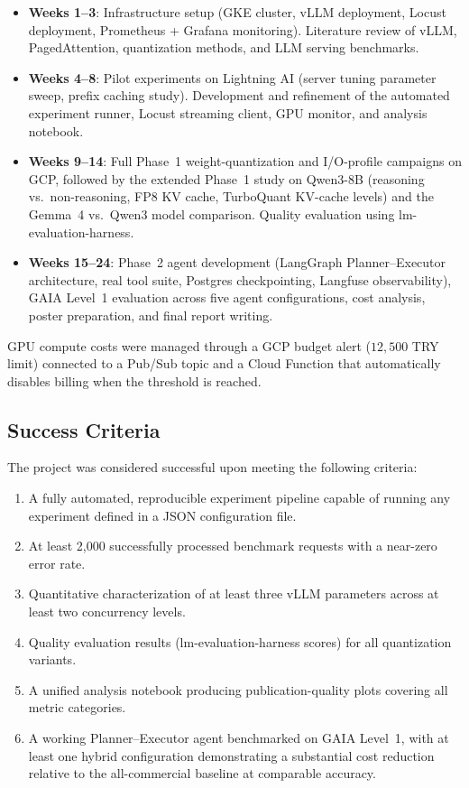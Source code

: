\documentclass[a4paper,12pt]{report}
\begin{document}
\begin{itemize}
    \item \textbf{Weeks 1--3}: Infrastructure setup (GKE cluster, vLLM deployment, Locust deployment, Prometheus + Grafana monitoring). Literature review of vLLM, PagedAttention, quantization methods, and LLM serving benchmarks.
    \item \textbf{Weeks 4--8}: Pilot experiments on Lightning AI (server tuning parameter sweep, prefix caching study). Development and refinement of the automated experiment runner, Locust streaming client, GPU monitor, and analysis notebook.
    \item \textbf{Weeks 9--14}: Full Phase~1 weight-quantization and I/O-profile campaigns on GCP, followed by the extended Phase~1 study on Qwen3-8B (reasoning vs.\ non-reasoning, FP8 KV cache, TurboQuant KV-cache levels) and the Gemma~4 vs.\ Qwen3 model comparison. Quality evaluation using lm-evaluation-harness.
    \item \textbf{Weeks 15--24}: Phase~2 agent development (LangGraph Planner--Executor architecture, real tool suite, Postgres checkpointing, Langfuse observability), GAIA Level~1 evaluation across five agent configurations, cost analysis, poster preparation, and final report writing.
\end{itemize}

GPU compute costs were managed through a GCP budget alert ($12{,}500$ TRY limit) connected to a Pub/Sub topic and a Cloud Function that automatically disables billing when the threshold is reached.

\subsection{Success Criteria}

The project was considered successful upon meeting the following criteria:

\begin{enumerate}
    \item A fully automated, reproducible experiment pipeline capable of running any experiment defined in a JSON configuration file.
    \item At least 2{,}000 successfully processed benchmark requests with a near-zero error rate.
    \item Quantitative characterization of at least three vLLM parameters across at least two concurrency levels.
    \item Quality evaluation results (lm-evaluation-harness scores) for all quantization variants.
    \item A unified analysis notebook producing publication-quality plots covering all metric categories.
    \item A working Planner--Executor agent benchmarked on GAIA Level~1, with at least one hybrid configuration demonstrating a substantial cost reduction relative to the all-commercial baseline at comparable accuracy.
\end{enumerate}
\end{document}
